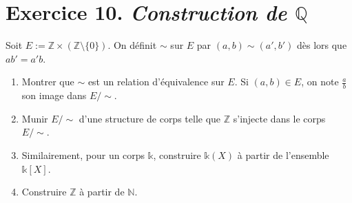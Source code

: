 \documentclass[./main]{subfiles}
\begin{document}
  \section{Exercice 10. \textit{Construction de $\mathds{Q}$}}
  \begin{enonce}
    Soit $E := \mathds{Z}\times (\mathds{Z} \setminus \{0\})$.
    On définit $\sim$ sur $E$ par $(a,b) \sim (a', b')$ dès lors que $a b' = a' b$.
    \begin{enumerate}
       \item Montrer que $\sim$ est un relation d'équivalence sur $E$. Si $(a,b) \in E$, on note $\frac{a}{b}$ son image dans $E/{\sim}$.
       \item Munir $E / {\sim}$ d'une structure de corps telle que  $\mathds{Z}$ s'injecte dans le corps $E / {\sim}$.
       \item Similairement, pour un corps $\mathds{k}$, construire $\mathds{k}(X)$ à partir de l'ensemble $\mathds{k}[X]$.
       \item Construire $\mathds{Z}$ à partir de $\mathds{N}$.
    \end{enumerate}
  \end{enonce}
\end{document}
